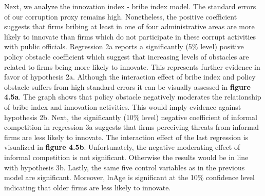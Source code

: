 Next, we analyze the innovation index - bribe index model. The standard errors of our corruption proxy remains high. Nonetheless, the positive coefficient suggests that firms bribing at least in one of four administrative areas are more likely to innovate than firms which do not participate in these corrupt activities with public officials. Regression 2a reports a significantly (5\% level) positive policy obstacle coefficient which suggest that increasing levels of obstacles are related to firms being more likely to innovate. This represents further evidence in favor of hypothesis 2a.
Although the interaction effect of bribe index and policy obstacle suffers from high standard errors it can be visually assessed in \textbf{figure 4.5a}. The graph shows that policy obstacle negatively moderates the relationship of bribe index and innovation activities. This would imply evidence against hypothesis 2b. Next, the significantly (10\% level) negative coefficient of informal competition in regression 3a suggests that firms perceiving threats from informal firms are less likely to innovate. The interaction effect of the last regression is visualized in \textbf{figure 4.5b}. Unfortunately, the negative moderating effect of informal competition is not significant. Otherwise the results would be in line with hypothesis 3b. Lastly, the same five control variables as in the previous model are significant. Moreover, lnAge is significant at the 10\% confidence level indicating that older firms are less likely to innovate. 

